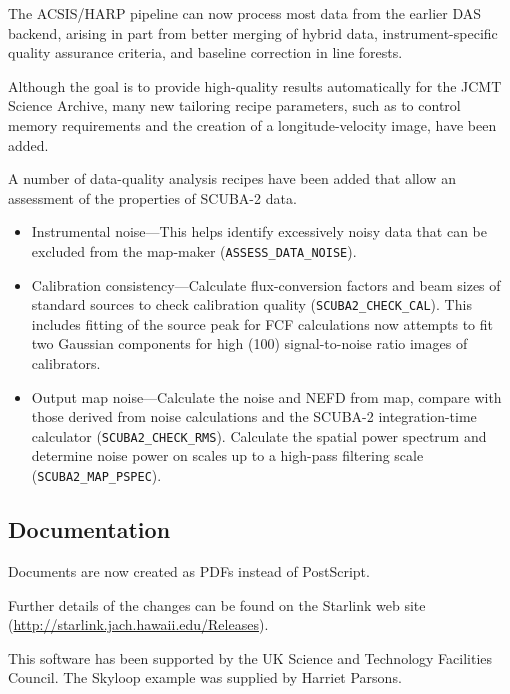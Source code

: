 \documentclass[11pt,twoside]{article}
\begin{document}
The ACSIS/HARP pipeline can now process most data from the earlier DAS
backend, arising in part from better merging of hybrid data,
instrument-specific quality assurance criteria, and baseline
correction in line forests.

Although the goal is to provide high-quality results automatically for
the JCMT Science Archive, many new tailoring recipe parameters, such
as to control memory requirements and the creation of a
longitude-velocity image, have been added.


A number of data-quality analysis recipes have been added that allow
an assessment of the properties of SCUBA-2 data.
\begin{itemize}
\item Instrumental noise---This helps identify excessively noisy data that
can be excluded from the map-maker (\texttt{ASSESS\_DATA\_NOISE}).
\item Calibration consistency---Calculate flux-conversion factors and beam
sizes of standard sources to check calibration quality
(\texttt{SCUBA2\_CHECK\_CAL}).  This includes fitting of the source peak
for FCF calculations now attempts to fit two Gaussian components for high
(100) signal-to-noise ratio images of calibrators.
\item Output map noise---Calculate the noise and NEFD from map,
compare with those derived from noise calculations and the SCUBA-2
integration-time calculator (\texttt{SCUBA2\_CHECK\_RMS}).  Calculate
the spatial power spectrum and determine noise power on scales up to a
high-pass filtering scale (\texttt{SCUBA2\_MAP\_PSPEC}).
\end{itemize}

\subsection*{Documentation}

Documents are now created as PDFs instead of PostScript.

\medskip
Further details of the changes can be found on the Starlink
web site\newline
(\url{http://starlink.jach.hawaii.edu/Releases}).

\acknowledgments This software has been supported by the UK Science
and Technology Facilities Council.  The Skyloop example was supplied
by Harriet Parsons.


\end{document}
